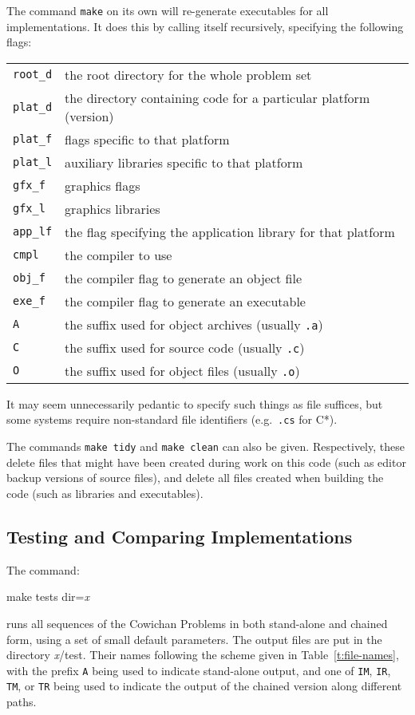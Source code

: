The command {\tt{make}} on its own will re-generate
executables for all implementations.
It does this by calling itself recursively,
specifying the following flags:
\begin{small}\begin{center}\begin{tabular}{ll}
{\tt{root\_d}}	& the root directory for the whole problem set	\\
{\tt{plat\_d}}	& the directory containing code for a particular platform (version)\\
{\tt{plat\_f}}	& flags specific to that platform \\
{\tt{plat\_l}}	& auxiliary libraries specific to that platform \\
{\tt{gfx\_f}}	& graphics flags \\
{\tt{gfx\_l}}	& graphics libraries \\
{\tt{app\_lf}}	& the flag specifying the application library for that platform\\
{\tt{cmpl}}	& the compiler to use \\
{\tt{obj\_f}}	& the compiler flag to generate an object file \\
{\tt{exe\_f}}	& the compiler flag to generate an executable \\
{\tt{A}}	& the suffix used for object archives (usually {\tt{.a}}) \\
{\tt{C}}	& the suffix used for source code (usually {\tt{.c}}) \\
{\tt{O}}	& the suffix used for object files (usually {\tt{.o}})
\end{tabular}\end{center}\end{small}
It may seem unnecessarily pedantic to specify such things as file suffices,
but some systems require non-standard file identifiers
(e.g.\ {\tt{.cs}} for C*).

The commands {\tt{make tidy}} and {\tt{make clean}} can also be given.
Respectively,
these delete files that might have been created during work on this code
(such as editor backup versions of source files),
and delete all files created when building the code
(such as libraries and executables).

\subsection{Testing and Comparing Implementations\label{s:make-test}}

The command:
\begin{progtext}
    make tests dir={\em{x}\/}
\end{progtext}
runs all sequences of the Cowichan Problems in both stand-alone and chained form,
using a set of small default parameters.
The output files are put in the directory {\em{x}\/}/test.
Their names following the scheme given in Table~\ref{t:file-names},
with the prefix {\tt{A}} being used to indicate stand-alone output,
and one of {\tt{IM}}, {\tt{IR}}, {\tt{TM}}, or {\tt{TR}} being used
to indicate the output of the chained version along different paths.

